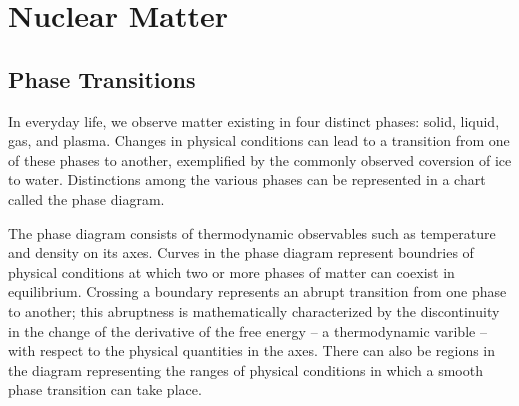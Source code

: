 
\section{Nuclear Matter}

\subsection{Phase Transitions}
In everyday life, we observe matter existing in four distinct phases: solid, liquid, gas, and plasma. Changes in physical conditions can lead to a transition from one of these phases to another, exemplified by the commonly observed coversion of ice to water. Distinctions among the various phases can be represented in a chart called the phase diagram.

The phase diagram consists of thermodynamic observables such as temperature and density on its axes. Curves in the phase diagram represent boundries of physical conditions at which two or more phases of matter can coexist in equilibrium. Crossing a boundary represents an abrupt transition from one phase to another; this abruptness is mathematically characterized by the discontinuity in the change of the derivative of the free energy -- a thermodynamic varible -- with respect to the physical quantities in the axes. There can also be regions in the diagram representing the ranges of physical conditions in which a smooth phase transition can take place.

